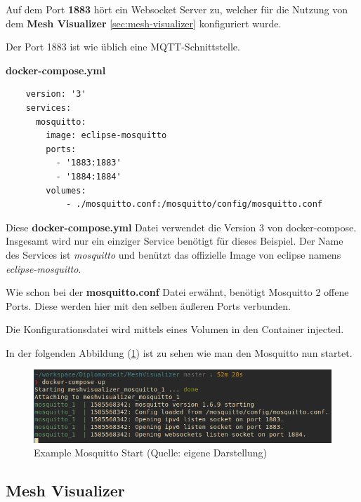 Auf dem Port \textbf{1883} hört ein Websocket Server zu, welcher für die Nutzung von dem \textbf{Mesh Visualizer} \ref{sec:mesh-visualizer} konfiguriert wurde. 

Der Port 1883 ist wie üblich eine MQTT-Schnittstelle.

\textbf{docker-compose.yml}
\begin{verbatim}
    version: '3'
    services:
      mosquitto:
        image: eclipse-mosquitto
        ports:
          - '1883:1883'
          - '1884:1884'
        volumes:
            - ./mosquitto.conf:/mosquitto/config/mosquitto.conf
\end{verbatim}
\vspace*{10px}

Diese \textbf{docker-compose.yml} Datei verwendet die Version 3 von docker-compose. Insgesamt wird nur ein einziger Service benötigt für dieses Beispiel. Der Name des Services ist \textit{mosquitto} und benützt das offizielle Image von eclipse namens \textit{eclipse-mosquitto}.

Wie schon bei der \textbf{mosquitto.conf} Datei erwähnt, benötigt Mosquitto 2 offene Ports. Diese werden hier mit den selben äußeren Ports verbunden.

Die Konfigurationsdatei wird mittels eines Volumen in den Container injected.

In der folgenden Abbildung (\ref{abb:example_mosquitto_start}) ist zu sehen wie man den Mosquitto nun startet.

\begin{figure}[H]
    \begin{center}
        \includegraphics[scale=0.8]{images/example_mosquitto_start.png}
        \caption{Example Mosquitto Start (Quelle: eigene Darstellung)}
        \label{abb:example_mosquitto_start}
    \end{center}
\end{figure}

\subsection{Mesh Visualizer}\label{sec:example-mesh-visualizer}

